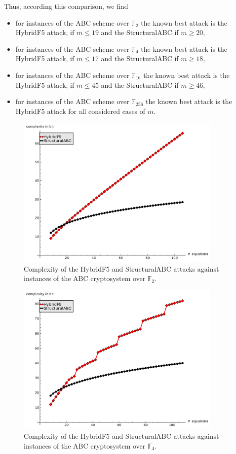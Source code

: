 Thus, according this comparison, we find 
\begin{itemize}
\item for instances of the ABC scheme over $\mathbb{F}_2$ the known best attack is the HybridF5 attack, if  $m\leq 19$ and the StructuralABC if $m\geq 20$,
\item for instances of the ABC scheme over $\mathbb{F}_4$ the known best attack is the HybridF5 attack, if  $m\leq 17$ and the StructuralABC if $m\geq 18$,
\item for instances of the ABC scheme over $\mathbb{F}_16$ the known best attack is the HybridF5 attack, if  $m\leq 45$ and the StructuralABC if $m\geq 46$,
\item for instances of the ABC scheme over $\mathbb{F}_{256}$ the known best attack is the HybridF5 attack for all considered cases of $m$.
\end{itemize}

\begin{figure}
\centering
\includegraphics[width=10cm]{figures/hybridF5_structural_vs_m_gf2.pdf}
\caption{Complexity of the HybridF5 and StructuralABC attacks against instances of the ABC cryptosystem over $\mathbb{F}_2$.}
\label{fig:hybridF5_structural_gf2}
\end{figure}

\begin{figure}
\centering
\includegraphics[width=10cm]{figures/hybridF5_structural_vs_m_gf4.pdf}
\caption{Complexity of the HybridF5 and StructuralABC attacks against instances of the ABC cryptosystem over $\mathbb{F}_4$.}
\label{fig:hybridF5_structural_gf4}
\end{figure}

